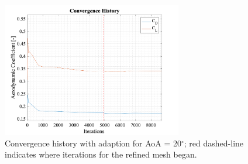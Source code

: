 \begin{figure}[H]
 \centering
 \includegraphics[width=0.7\textwidth]{matlab_images/999_conv_history.png}
 \caption{Convergence history with adaption for AoA = 20$^\circ$; red dashed-line indicates where iterations for the refined mesh began.}
 \label{fig: conv_hist_20_adapt}
\end{figure}